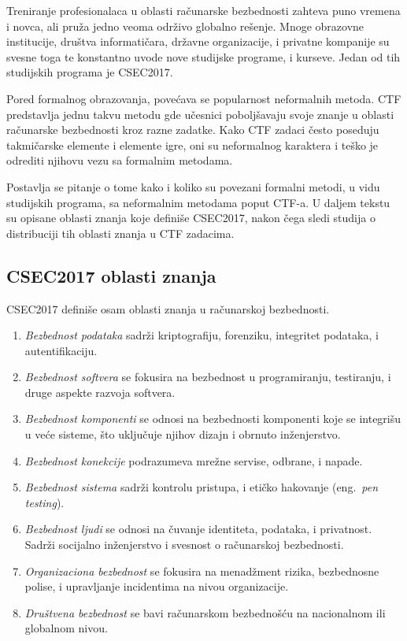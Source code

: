 \documentclass[12pt, a4paper, twocolumn]{article}
\begin{document}
Treniranje profesionalaca u oblasti računarske bezbednosti zahteva puno 
vremena i novca, ali pruža jedno veoma održivo globalno rešenje. Mnoge 
obrazovne institucije, društva informatičara, državne organizacije, i privatne
kompanije su svesne toga te konstantno uvode nove studijske programe, 
i kurseve. Jedan od tih studijskih programa je CSEC2017. \cite{ctf_csec}

Pored formalnog obrazovanja, povećava se popularnost neformalnih metoda.
CTF predstavlja jednu takvu metodu gde učesnici poboljšavaju svoje znanje u
oblasti računarske bezbednosti kroz razne zadatke. Kako CTF zadaci često 
poseduju takmičarske elemente i elemente igre, oni su neformalnog karaktera
i teško je odrediti njihovu vezu sa formalnim metodama.

Postavlja se pitanje o tome kako i koliko su povezani formalni metodi,
u vidu studijskih programa, sa neformalnim metodama poput CTF-a. U daljem 
tekstu su opisane oblasti znanja koje definiše CSEC2017, nakon čega sledi 
studija o distribuciji tih oblasti znanja u CTF zadacima.

\subsection{CSEC2017 oblasti znanja}

CSEC2017 definiše osam oblasti znanja u računarskoj bezbednosti.
\begin{enumerate}
    \item \emph{Bezbednost podataka} sadrži kriptografiju, forenziku, 
        integritet podataka, i autentifikaciju.
    \item \emph{Bezbednost softvera} se fokusira na bezbednost u 
        programiranju, testiranju, i druge aspekte razvoja softvera.
    \item \emph{Bezbednost komponenti} se odnosi na bezbednosti komponenti 
        koje se integrišu u veće sisteme, što uključuje njihov dizajn i 
        obrnuto inženjerstvo.
    \item \emph{Bezbednost konekcije} podrazumeva mrežne servise, odbrane, i 
        napade.
    \item \emph{Bezbednost sistema} sadrži kontrolu pristupa, i etičko 
        hakovanje (eng.\ \emph{pen testing}).
    \item \emph{Bezbednost ljudi} se odnosi na čuvanje identiteta, podataka, 
        i privatnost. Sadrži socijalno inženjerstvo i svesnost o računarskoj 
        bezbednosti.
    \item \emph{Organizaciona bezbednost} se fokusira na menadžment rizika, 
        bezbednosne polise, i upravljanje incidentima na nivou organizacije.
    \item \emph{Društvena bezbednost} se bavi računarskom bezbednošću 
        na nacionalnom ili globalnom nivou.
\end{enumerate}
\end{document}
